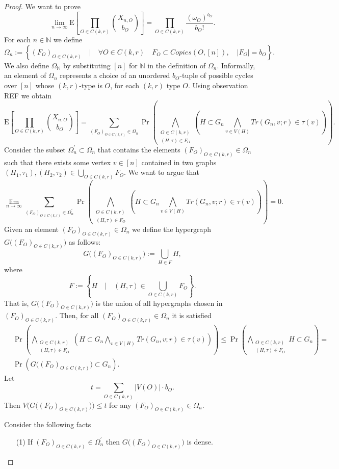 \documentclass[12pt,notitlepage,a4paper]{article}
\theoremstyle{definition}
\newcommand{\N}{\mathbb{N}}
\newcommand{\Ln}{\lim\limits_{n\to \infty}}
\begin{document}
\begin{proof}
	We want to prove 
	\[
	\Ln 
	\mathrm{E}\left[
	\prod_{O\in C(k,r)}
	\binom{X_{n,O}}{b_O}
	\right]= \prod_{O\in C(k,r)} 
	\frac{(\omega_O)^{b_O}}{b_O!}.
	\]
	For each $n\in \N$ we define
	\[
	\Omega_n:=\left\{
	(F_O)_{O\in C(k,r)} \quad \Big|
	\quad \forall O\in C(k,r) \quad
	F_O\subset Copies(O,[n]), \quad
	|F_O|=b_O	
	\right\}.
	\]
	We also define $\Omega_\N$ by substituting $[n]$ for $\N$ in
	the definition of $\Omega_n$. Informally, an element of $\Omega_n$ 
	represents a choice of an unordered $b_O$-tuple
	of possible cycles over $[n]$ whose $(k,r)$-type is $O$, for each
	$(k,r)$ type $O$. Using observation REF we obtain
	\[
	\mathrm{E}\left[
	\prod_{O\in C(k,r)}
	\binom{X_{n,O}}{b_O}
	\right]=
	\sum_{(F_O)_{O\in C(k,r)}\in \Omega_n}
	\Pr\left(
	\bigwedge_{
	\substack{
	O\in C(k,r)\\
	(H,\tau)\in F_O
	}}
	\left(
	H\subset G_n
	\bigwedge_{v\in V(H)}
	Tr(G_n,v;r)\in \tau(v)
	\right)
	\right).
	\]
	Consider the subset $\Omega_n^\prime\subset \Omega_n$ that contains
	the elements $(F_O)_{O\in C(k,r)}\in \Omega_n$ such that there exists
	some vertex $v\in [n]$ contained in two graphs
	$(H_1,\tau_1),(H_2,\tau_2)\in \bigcup_{O\in C(k,r)} F_O$. We want to argue 
	that
	\begin{equation}\label{eqn:denseconfigurations}
	\Ln
	\sum_{(F_O)_{O\in C(k,r)}\in \Omega_n^\prime}
	\Pr\left(
	\bigwedge_{
		\substack{
			O\in C(k,r)\\
			(H,\tau)\in F_O
	}}
	\left(
	H\subset G_n
	\bigwedge_{v\in V(H)}
	Tr(G_n,v;r)\in \tau(v)
	\right)
	\right)=0.
	\end{equation}
	Given an element $(F_O)_{O\in C(k,r)}\in \Omega_n$ we 
	define the hypergraph $G\Big((F_O)_{O\in C(k,r)}\Big)$ as
	follows:
	\[
	G\Big((F_O)_{O\in C(k,r)}\Big):=
	\bigcup_{H\in F} H, 
	\]
	where
	\[
	F:=\left\{
	H \quad \Big| \quad 
	(H,\tau)\in \bigcup_{O\in C(k,r)} F_O	
	\right\}.
	\]
	That is, $G\Big((F_O)_{O\in C(k,r)}\Big)$
	is the union of all hypergraphs chosen in 
	$(F_O)_{O\in C(k,r)}$. Then, for all 
	$(F_O)_{O\in C(k,r)}\in \Omega_n$ it is 
	satisfied
	\begin{align*}
	&\Pr\left(
	\bigwedge_{
		\substack{
			O\in C(k,r)\\
			(H,\tau)\in F_O
	}}
	\left(
	H\subset G_n
	\bigwedge_{v\in V(H)}
	Tr(G_n,v;r)\in \tau(v)
	\right)
	\right)
	\leq 
	\Pr\left(
	\bigwedge_{
		\substack{
			O\in C(k,r)\\
			(H,\tau)\in F_O
	}}
	H\subset G_n
	\right) =
	\\&
	\Pr \left(
	G\Big((F_O)_{O\in C(k,r)}\Big) \subset G_n
	\right).
	\end{align*}
	Let 
	\[
	t = \sum_{O\in C(k,r)} |V(O)|\cdot b_O.
	\]
	Then $V\Big(
	G\Big((F_O)_{O\in C(k,r)}\Big)
	\Big) \leq t$
	for any $(F_O)_{O\in C(k,r)}\in \Omega_n$.\par
	Consider the following facts
	\begin{itemize}
		\item[(1)] If $(F_O)_{O\in C(k,r)}\in \Omega_n^\prime$ then
		$G\big((F_O)_{O\in C(k,r)}\big)$ is dense.
		 

\end{itemize}
\end{proof}
\end{document}
